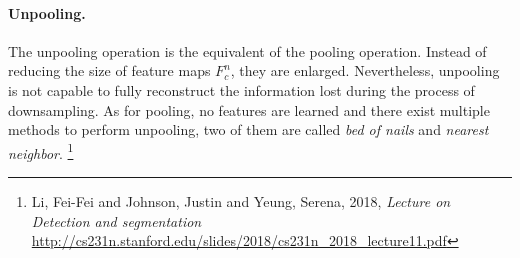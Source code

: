 \paragraph{Unpooling.}
The unpooling operation is the equivalent of the pooling operation.
Instead of reducing the size of feature maps $F^{n}_{c}$, they are enlarged.
Nevertheless, unpooling is not capable to fully reconstruct the information lost during the process of downsampling.
As for pooling, no features are learned and there exist multiple methods to perform unpooling, two of them are called \textit{bed of nails} and \textit{nearest neighbor}. \footnote{Li, Fei-Fei and Johnson, Justin and Yeung, Serena, 2018, \textit{Lecture on Detection and segmentation} \url{http://cs231n.stanford.edu/slides/2018/cs231n_2018_lecture11.pdf}}

